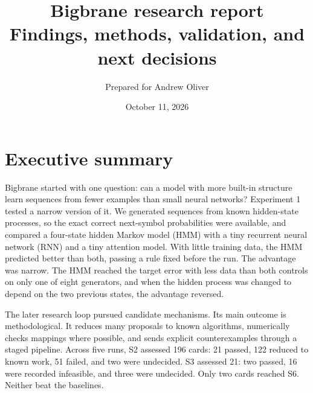 
\usepackage{amsmath,amssymb}
\usepackage{needspace}
\usetikzlibrary{positioning}
\title{\vspace{-1.2cm}\color{palA}\Huge Bigbrane research report\\[3pt]\large Findings, methods, validation, and next decisions}
\author{Prepared for Andrew Oliver}
\date{October 11, 2026}

\maketitle
\thispagestyle{fancy}

\section{Executive summary}

Bigbrane started with one question: can a model with more built-in structure learn sequences from fewer examples than small neural networks? Experiment 1 tested a narrow version of it. We generated sequences from known hidden-state processes, so the exact correct next-symbol probabilities were available, and compared a four-state hidden Markov model (HMM) with a tiny recurrent neural network (RNN) and a tiny attention model. With little training data, the HMM predicted better than both, passing a rule fixed before the run. The advantage was narrow. The HMM reached the target error with less data than both controls on only one of eight generators, and when the hidden process was changed to depend on the two previous states, the advantage reversed.

The later research loop pursued candidate mechanisms. Its main outcome is methodological. It reduces many proposals to known algorithms, numerically checks mappings where possible, and sends explicit counterexamples through a staged pipeline. Across five runs, S2 assessed 196 cards: 21 passed, 122 reduced to known work, 51 failed, and two were undecided. S3 assessed 21: two passed, 16 were recorded infeasible, and three were undecided. Only two cards reached S6. Neither beat the baselines.

